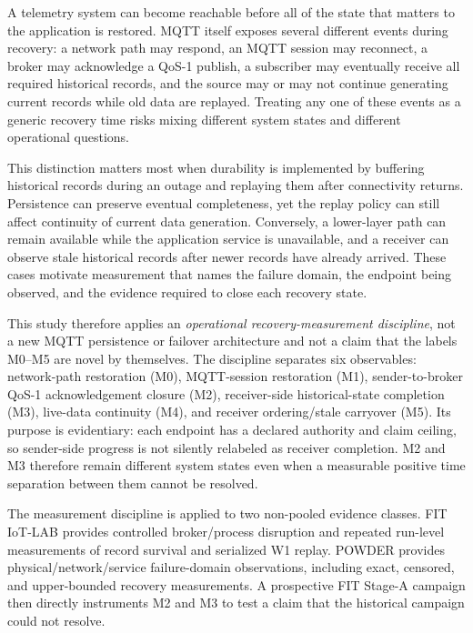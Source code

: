 \documentclass[journal]{IEEEtran}
\begin{document}
A telemetry system can become reachable before all of the state that matters to the application is restored. MQTT itself exposes several different events during recovery: a network path may respond, an MQTT session may reconnect, a broker may acknowledge a QoS-1 publish, a subscriber may eventually receive all required historical records, and the source may or may not continue generating current records while old data are replayed. Treating any one of these events as a generic recovery time risks mixing different system states and different operational questions.

This distinction matters most when durability is implemented by buffering historical records during an outage and replaying them after connectivity returns. Persistence can preserve eventual completeness, yet the replay policy can still affect continuity of current data generation. Conversely, a lower-layer path can remain available while the application service is unavailable, and a receiver can observe stale historical records after newer records have already arrived. These cases motivate measurement that names the failure domain, the endpoint being observed, and the evidence required to close each recovery state.

This study therefore applies an \emph{operational recovery-measurement discipline}, not a new MQTT persistence or failover architecture and not a claim that the labels M0--M5 are novel by themselves. The discipline separates six observables: network-path restoration (M0), MQTT-session restoration (M1), sender-to-broker QoS-1 acknowledgement closure (M2), receiver-side historical-state completion (M3), live-data continuity (M4), and receiver ordering/stale carryover (M5). Its purpose is evidentiary: each endpoint has a declared authority and claim ceiling, so sender-side progress is not silently relabeled as receiver completion. M2 and M3 therefore remain different system states even when a measurable positive time separation between them cannot be resolved.

The measurement discipline is applied to two non-pooled evidence classes. FIT IoT-LAB provides controlled broker/process disruption and repeated run-level measurements of record survival and serialized W1 replay. POWDER provides physical/network/service failure-domain observations, including exact, censored, and upper-bounded recovery measurements. A prospective FIT Stage-A campaign then directly instruments M2 and M3 to test a claim that the historical campaign could not resolve.
\end{document}
